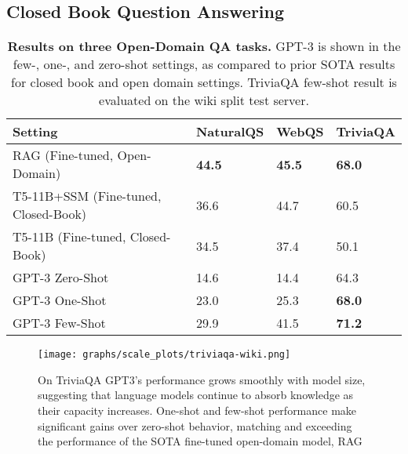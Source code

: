 \documentclass{article}
\begin{document}
    \subsection{Closed Book Question Answering}
    \label{section:Closed Book Question Answering / Knowledge Base Tasks}
    \begin{table}
    \centering
        \begin{tabular}{l l l l}
        \toprule
        Setting & NaturalQS & WebQS & TriviaQA \\ 
        \midrule
        RAG (Fine-tuned, Open-Domain) \cite{lewis2020retrieval} & \textbf{44.5} & \textbf{45.5} & \textbf{68.0} \\
        T5-11B+SSM (Fine-tuned, Closed-Book) \cite{roberts2020much} & 36.6 & 44.7 & 60.5 \\ 
        T5-11B (Fine-tuned, Closed-Book) & 34.5  & 37.4 & 50.1 \\
        GPT-3 Zero-Shot & 14.6 & 14.4 & 64.3 \\
        GPT-3 One-Shot & 23.0 & 25.3 & \textbf{68.0} \\
        GPT-3 Few-Shot & 29.9 & 41.5 & \textbf{71.2} \\
        \bottomrule
        \end{tabular}
    \caption{\textbf{Results on three Open-Domain QA tasks.} GPT-3 is shown in the few-, one-, and zero-shot settings, as compared to prior SOTA results for closed book and open domain settings.  TriviaQA few-shot result is evaluated on the wiki split test server.}
    \label{table:question}
\end{table}

\begin{figure}
\vspace{-1em}\centering\texttt{[image: graphs/scale\_plots/triviaqa-wiki.png]}
\caption{On TriviaQA GPT3's performance grows smoothly with model size, suggesting that language models continue to absorb knowledge as their capacity increases.  One-shot and few-shot performance make significant gains over zero-shot behavior, matching and exceeding the performance of the SOTA fine-tuned open-domain model, RAG \cite{lewis2020retrieval}}
\label{graph:triviaqa}
\end{figure}
\end{document}
